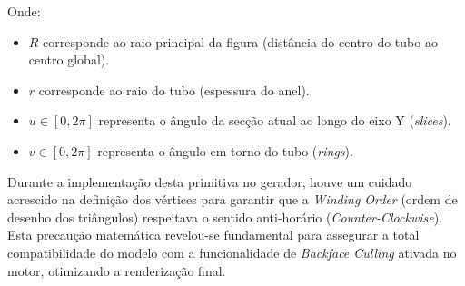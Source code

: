 \documentclass[12pt,a4paper]{article}
\begin{document}
Onde:
\begin{itemize}
    \item $R$ corresponde ao raio principal da figura (distância do centro do tubo ao centro global).
    \item $r$ corresponde ao raio do tubo (espessura do anel).
    \item $u \in [0, 2\pi]$ representa o ângulo da secção atual ao longo do eixo Y (\textit{slices}).
    \item $v \in [0, 2\pi]$ representa o ângulo em torno do tubo (\textit{rings}).
\end{itemize}
Durante a implementação desta primitiva no gerador, houve um cuidado acrescido na definição dos vértices para garantir que a \textit{Winding Order} (ordem de desenho dos triângulos) respeitava o sentido anti-horário (\textit{Counter-Clockwise}). Esta precaução matemática revelou-se fundamental para assegurar a total compatibilidade do modelo com a funcionalidade de \textit{Backface Culling} ativada no motor, otimizando a renderização final.
\end{document}

